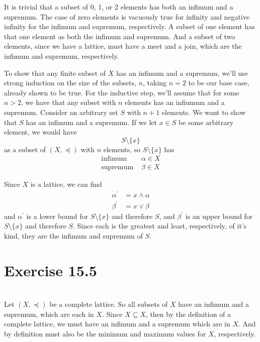 \documentclass[11pt]{article}
\begin{document}
It is trivial that a subset of 0, 1, or 2 elements has both an infimum and a supremum. The case of zero elements is vacuously true for infinity and negative infinity for the infimum and supremum, respectively. A subset of one element has that one element as both the infimum and supremum. And a subset of two elements, since we have a lattice, must have a meet and a join, which are the infimum and supremum, respectively.

To show that any finite subset of $X$ has an infimum and a supremum, we'll use strong induction on the size of the subsets, $n$, taking $n=2$ to be our base case, already shown to be true. For the inductive step, we'll assume that for some $n > 2$, we have that any subset with $n$ elements has an infiumum and a supremum. Consider an arbitrary set $S$ with $n+1$ elements. We want to show that $S$ has an infimum and a supremum. If we let $x\in S$ be some arbitrary element, we would have
\[S\setminus\{x\}\]
as a subset of $(X, \preceq)$ with $n$ elements, so $S\setminus\{x\}$ has
\begin{align*}
    \text{infimum } & \alpha\in X \\
    \text{supremum } & \beta\in X
\end{align*}

Since $X$ is a lattice, we can find
\begin{align*}
    \alpha^\prime &= x \wedge \alpha \\
    \beta^\prime &= x \vee \beta
\end{align*}
and $\alpha^\prime$ is a lower bound for $S\setminus\{x\}$ and therefore $S$, and $\beta^\prime$ is an upper bound for $S\setminus\{x\}$ and therefore $S$. Since each is the greatest and least, respectively, of it's kind, they are the infimum and supremum of $S$.


\section*{Exercise 15.5}
\\

Let $(X, \preceq)$ be a complete lattice. So all subsets of $X$ have an infimum and a supremum, which are each in $X$. Since $X \subseteq X$, then by the definition of a complete lattice, we must have an infimum and a supremum which are in $X$. And by definition must also be the minimum and maximum values for $X$, respectively.
\end{document}
